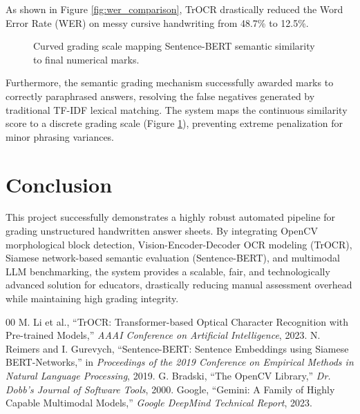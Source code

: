 \documentclass[conference]{IEEEtran}
\begin{document}
As shown in Figure \ref{fig:wer_comparison}, TrOCR drastically reduced the Word Error Rate (WER) on messy cursive handwriting from 48.7\% to 12.5\%. 

\begin{figure}[htbp]
    \centering
    \caption{Curved grading scale mapping Sentence-BERT semantic similarity to final numerical marks.}
    \label{fig:grading_curve}
\end{figure}

Furthermore, the semantic grading mechanism successfully awarded marks to correctly paraphrased answers, resolving the false negatives generated by traditional TF-IDF lexical matching. The system maps the continuous similarity score to a discrete grading scale (Figure \ref{fig:grading_curve}), preventing extreme penalization for minor phrasing variances.

\section{Conclusion}
This project successfully demonstrates a highly robust automated pipeline for grading unstructured handwritten answer sheets. By integrating OpenCV morphological block detection, Vision-Encoder-Decoder OCR modeling (TrOCR), Siamese network-based semantic evaluation (Sentence-BERT), and multimodal LLM benchmarking, the system provides a scalable, fair, and technologically advanced solution for educators, drastically reducing manual assessment overhead while maintaining high grading integrity.

\begin{thebibliography}{00}
 M. Li et al., ``TrOCR: Transformer-based Optical Character Recognition with Pre-trained Models,'' \textit{AAAI Conference on Artificial Intelligence}, 2023.
 N. Reimers and I. Gurevych, ``Sentence-BERT: Sentence Embeddings using Siamese BERT-Networks,'' in \textit{Proceedings of the 2019 Conference on Empirical Methods in Natural Language Processing}, 2019.
 G. Bradski, ``The OpenCV Library,'' \textit{Dr. Dobb's Journal of Software Tools}, 2000.
 Google, ``Gemini: A Family of Highly Capable Multimodal Models,'' \textit{Google DeepMind Technical Report}, 2023.
\end{thebibliography}
\end{document}
